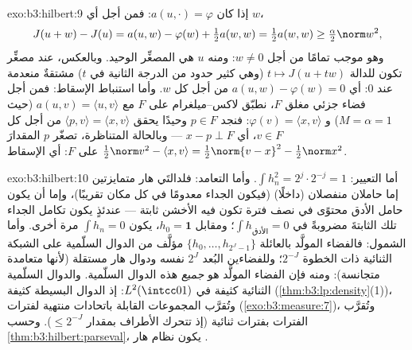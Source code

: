 \begin{solution}{exo:b3:hilbert:9}
إذا كان $a(u, \cdot) = \varphi$: فمن أجل أي $w$،
\[
J(u + w) - J(u) = a(u, w) - \varphi(w) + \tfrac12a(w,w)
= \tfrac12a(w,w) \geq \tfrac\alpha2\norm w^2,
\]
وهو موجب تمامًا من أجل $w \neq 0$: ومنه $u$ هي المصغِّر الوحيد.
وبالعكس، عند مصغِّر تكون للدالة $t \mapsto J(u + tw)$ (وهي كثير حدود من الدرجة
الثانية في $t$) مشتقةٌ منعدمة عند $0$: أي $a(u, w) - \varphi(w) = 0$ من أجل كل $w$.
وأما استنباط الإسقاط: فمن أجل فضاء جزئي مغلق $F$، نطبّق
لاكس--ميلغرام على  $F$ مع $a(u,v) = \langle u, v\rangle$ (حيث
$M = \alpha = 1$) و $\varphi(v) = \langle x, v\rangle$: فنجد $p \in F$ وحيدًا يحقق $\langle p, v\rangle = \langle x,
v\rangle$
من أجل كل $v \in F$، أي $x - p \perp F$ --- وبالحالة المتناظرة،
تصغّر $p$ المقدارَ $\frac12\norm v^2 - \langle
x, v\rangle = \frac12\norm{v - x}^2 - \frac12\norm x^2$ على $F$: أي الإسقاط.
\end{solution}

\begin{solution}{exo:b3:hilbert:10}
أما التعيير: $\int h_n^2 = 2^j\cdot 2^{-j} = 1$. وأما التعامد: فلدالتَي هار متمايزتين إما
حاملان منفصلان (داخلًا) (فيكون الجداء معدومًا في كل مكان
تقريبًا)، وإما أن يكون حامل الأدق محتوًى في نصف فترة تكون فيه
الأخشن ثابتة --- عندئذٍ يكون تكامل الجداء تلك الثابتةَ مضروبةً
في $\int h_{\text{الأدق}} = 0$؛ ومقابل $h_0
= \mathbf 1$، يكون $\int h_n = 0$ مرة أخرى. وأما
الشمول: فالفضاء المولَّد بالعائلة $\{h_0, \dots, h_{2^J-1}\}$ مؤلَّف من الدوال السلّمية
على الشبكة الثنائية ذات الخطوة $2^{-J}$؛ وللفضاءين البُعد
$2^J$ نفسه ودوال هار مستقلة (لأنها متعامدة متجانسة): ومنه فإن
الفضاء المولَّد هو \emph{جميع} هذه الدوال السلّمية. والدوال
السلّمية الثنائية كثيفة في $L^2(\intcc01)$: إذ الدوال البسيطة
كثيفة (\cref{thm:b3:lp:density}(1))، وتُقرَّب المجموعات القابلة 
باتحادات منتهية لفترات (\cref{exo:b3:measure:7})، وتُقرَّب الفترات
بفترات ثنائية (إذ تتحرك الأطراف بمقدار $\leq 2^{-J}$). وحسب
\cref{thm:b3:hilbert:parseval}، يكون نظام هار .
\end{solution}

